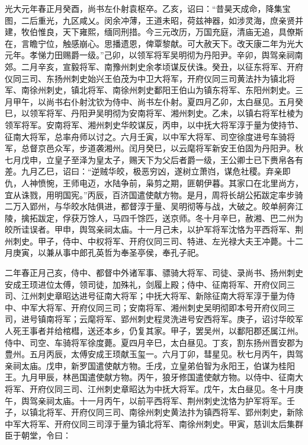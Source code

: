 \documentclass[]{article}
\begin{document}
光大元年春正月癸酉，尚书左仆射袁枢卒。乙亥，诏曰：``昔昊天成命，降集宝图，二后重光，九区咸乂。闵余冲薄，王道未昭，荷兹神器，如涉灵海，庶亲贤并建，牧伯惟良，天下雍熙，缅同刑措。今三元改历，万国充庭，清庙无追，具僚斯在，言瞻宁位，触感崩心。思播遗恩，俾覃黎献。可大赦天下。改天康二年为光大元年。孝悌力田赐爵一级。''己卯，以领军将军吴明彻为丹阳尹。辛卯，舆驾亲祠南郊。二月辛亥，宣毅将军、南豫州刺史余孝顷谋反伏诛。癸丑，以征东将军、开府仪同三司、东扬州刺史始兴王伯茂为中卫大将军，开府仪同三司黄法抃为镇北将军、南徐州刺史，镇北将军、南徐州刺史鄱阳王伯山为镇东将军、东阳州刺史。三月甲午，以尚书右仆射沈钦为侍中、尚书左仆射。夏四月乙卯，太白昼见。五月癸巳，以领军将军、丹阳尹吴明彻为安南将军、湘州刺史。乙未，以镇右将军杜棱为领军将军。安南将军、湘州刺史华皎谋反，丙申，以中抚大将军淳于量为使持节、征南大将军，总率舟师以讨之。六月壬寅，以中军大将军、司空徐度进号车骑将军，总督京邑众军，步道袭湘州。闰月癸巳，以云麾将军新安王伯固为丹阳尹。秋七月戊申，立皇子至泽为皇太子，赐天下为父后者爵一级，王公卿士已下赉帛各有差。九月乙巳，诏曰：``逆贼华皎，极恶穷凶，遂树立萧岿，谋危社稷。弃亲即仇，人神愤惋，王师电迈，水陆争前，枭剪之期，匪朝伊暮。其家口在北里尚方，宜从诛戮，用明国宪。''丙辰，百济国遣使献方物。是月，周将长胡公拓跋定率步骑二万入郢州，与华皎水陆俱进，都督淳于量、吴明彻等与战，大破之。皎单舸奔江陵，擒拓跋定，俘获万馀人，马四千馀匹，送京师。冬十月辛巳，赦湘、巴二州为皎所诖误者。甲申，舆驾亲祠太庙。十一月己未，以护军将军沈恪为平西将军、荆州刺史。甲子，侍中、中权将军、开府仪同三司、特进、左光禄大夫王冲薨。十二月庚寅，以兼从事中郎孔英哲为奉圣亭侯，奉孔子祀。

二年春正月己亥，侍中、都督中外诸军事、骠骑大将军、司徒、录尚书、扬州刺史安成王顼进位太傅，领司徒，加殊礼，剑履上殿；侍中、征南将军、开府仪同三司、江州刺史章昭达进号征南大将军；中抚大将军、新除征南大将军淳于量为侍中、中军大将军、开府仪同三司；安南将军、湘州刺史吴明彻即本号开府仪同三司，进号镇南将军；云麾将军、郢州刺史程灵洗进号安西将军。庚子，诏讨华皎军人死王事者并给棺槥，送还本乡，仍复其家。甲子，罢吴州，以鄱阳郡还属江州。侍中、司空、车骑将军徐度薨。夏四月辛巳，太白昼见。丁亥，割东扬州晋安郡为豊州。五月丙辰，太傅安成王顼献玉玺一。六月丁卯，彗星见。秋七月丙午，舆驾亲祠太庙。戊申，新罗国遣使献方物。壬戌，立皇弟伯智为永阳王，伯谋为桂阳王。九月甲辰，林邑国遣使献方物。丙午，狼牙修国遣使献方物。以侍中、征南大将军、开府仪同三司、江州刺史章昭达为中抚大将军。戊午，太白昼见。冬十月庚午，舆驾亲祠太庙。十一月丙午，以前平西将军、荆州刺史沈恪为护军将军。壬子，以镇北将军、开府仪同三司、南徐州刺史黄法抃为镇西将军、郢州刺史，新除中军大将军、开府仪同三司淳于量为镇北将军、南徐州刺史。甲寅，慈训太后集群臣于朝堂，令曰：
\end{document}
